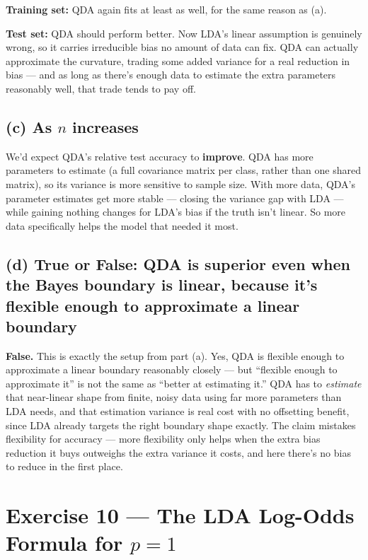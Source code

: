 \documentclass[
  11pt,
]{article}
\begin{document}
\textbf{Training set:} QDA again fits at least as well, for the same
reason as (a).

\textbf{Test set:} QDA should perform better. Now LDA's linear
assumption is genuinely wrong, so it carries irreducible bias no amount
of data can fix. QDA can actually approximate the curvature, trading
some added variance for a real reduction in bias --- and as long as
there's enough data to estimate the extra parameters reasonably well,
that trade tends to pay off.

\subsection{\texorpdfstring{(c) As \(n\)
increases}{(c) As n increases}}\label{c-as-n-increases}

We'd expect QDA's relative test accuracy to \textbf{improve}. QDA has
more parameters to estimate (a full covariance matrix per class, rather
than one shared matrix), so its variance is more sensitive to sample
size. With more data, QDA's parameter estimates get more stable ---
closing the variance gap with LDA --- while gaining nothing changes for
LDA's bias if the truth isn't linear. So more data specifically helps
the model that needed it most.

\subsection{(d) True or False: QDA is superior even when the Bayes
boundary is linear, because it's flexible enough to approximate a linear
boundary}\label{d-true-or-false-qda-is-superior-even-when-the-bayes-boundary-is-linear-because-its-flexible-enough-to-approximate-a-linear-boundary}

\textbf{False.} This is exactly the setup from part (a). Yes, QDA is
flexible enough to approximate a linear boundary reasonably closely ---
but ``flexible enough to approximate it'' is not the same as ``better at
estimating it.'' QDA has to \emph{estimate} that near-linear shape from
finite, noisy data using far more parameters than LDA needs, and that
estimation variance is real cost with no offsetting benefit, since LDA
already targets the right boundary shape exactly. The claim mistakes
flexibility for accuracy --- more flexibility only helps when the extra
bias reduction it buys outweighs the extra variance it costs, and here
there's no bias to reduce in the first place.

\newpage

\section{\texorpdfstring{Exercise 10 --- The LDA Log-Odds Formula for
\(p = 1\)}{Exercise 10 --- The LDA Log-Odds Formula for p = 1}}\label{exercise-10-the-lda-log-odds-formula-for-p-1}
\end{document}
